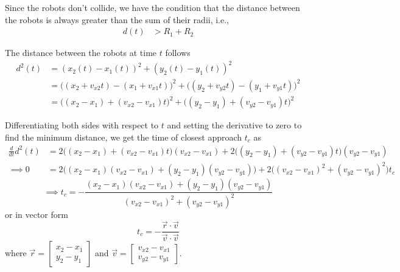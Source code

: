 Since the robots don't collide, we have the condition that the distance between the robots is always greater than the sum of their radii, i.e.,
\begin{align*}
    d(t) & > R_1 + R_2
\end{align*}

The distance between the robots at time \( t \) follows
\begin{align*}
    d^2(t)
     & =
    (x_2(t) - x_1(t))^2 + (y_2(t) - y_1(t))^2
    \\ & =
    \big((x_2 + v_{x2}t) - (x_1 + v_{x1}t)\big)^2 + \big((y_2 + v_{y2}t) - (y_1 + v_{y1}t)\big)^2
    \\ & =
    \big((x_2 - x_1) + (v_{x2} - v_{x1})t\big)^2 + \big((y_2 - y_1) + (v_{y2} - v_{y1})t\big)^2
\end{align*}

Differentiating both sides with respect to \( t \) and setting the derivative to zero to find the minimum distance, we get the time of closest approach \( t_c \) as
\begin{align*}
    \frac{d}{dt}d^2(t)
     & =
    2\big((x_2 - x_1) + (v_{x2} - v_{x1})t\big)(v_{x2} - v_{x1}) + 2\big((y_2 - y_1) + (v_{y2} - v_{y1})t\big)(v_{y2} - v_{y1})
    \\ \implies
    0
     & =
    2\big((x_2 - x_1)(v_{x2} - v_{x1}) + (y_2 - y_1)(v_{y2} - v_{y1})\big) + 2\big((v_{x2} - v_{x1})^2 + (v_{y2} - v_{y1})^2\big) t_c
\end{align*}
\begin{equation*}
    \implies
    \boxed{
        t_c
        =
        -\frac{(x_2 - x_1)(v_{x2} - v_{x1}) + (y_2 - y_1)(v_{y2} - v_{y1})}{(v_{x2} - v_{x1})^2 + (v_{y2} - v_{y1})^2}
    }
\end{equation*}
or in vector form
\begin{equation*}
    t_c
    =
    -\frac{\vec{r} \cdot \vec{v}}{\vec{v} \cdot \vec{v}}
\end{equation*}
where \( \vec{r} = \begin{bmatrix} x_2 - x_1 \\ y_2 - y_1 \end{bmatrix} \) and \( \vec{v} = \begin{bmatrix} v_{x2} - v_{x1} \\ v_{y2} - v_{y1} \end{bmatrix} \).

